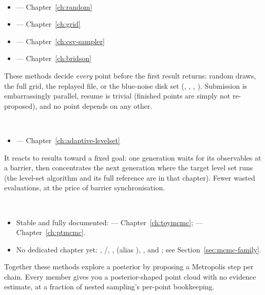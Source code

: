 \begin{description}[style=nextline, leftmargin=1.2em]
  \item[Simple methods] \mbox{}\\[-0.4\baselineskip]
        \begin{itemize}
          \item {} --- Chapter~\ref{ch:random}
          \item {} --- Chapter~\ref{ch:grid}
          \item {} --- Chapter~\ref{ch:csv-sampler}
          \item {} --- Chapter~\ref{ch:bridson}
        \end{itemize}
        These methods decide \emph{every} point before the first result returns:
         random draws, the full grid, the replayed file, or the
        blue-noise disk set (, , ,
        ). Submission is
        embarrassingly parallel, resume is trivial (finished points are simply not
        re-proposed), and no point depends on any other.
        
  \item[The adaptive method] \mbox{}\\[-0.4\baselineskip]
        \begin{itemize}
          \item {} --- Chapter~\ref{ch:adaptive-levelset}
        \end{itemize}
        It reacts to results toward a fixed goal: one generation waits for its
        observables at a barrier, then concentrates the next generation where the target
        level set runs (the level-set algorithm and its full reference are in that
        chapter). Fewer
        wasted evaluations, at the price of barrier synchronisation.
        
  \item[\textsc{mcmc} methods] \mbox{}\\[-0.4\baselineskip]
        \begin{itemize}
          \item Stable and fully documented:  ---
                Chapter~\ref{ch:toymcmc};  --- Chapter~\ref{ch:ptmcmc}.
          \item No dedicated chapter yet: , /,
                ,  (alias ),
                , and ; see
                Section~\ref{sec:mcmc-family}.
        \end{itemize}
        Together these methods explore a posterior by proposing a Metropolis step per
        chain. Every member gives you a posterior-shaped point cloud with no evidence
        estimate, at a
        fraction of nested sampling's per-point bookkeeping.
        

\end{description}
